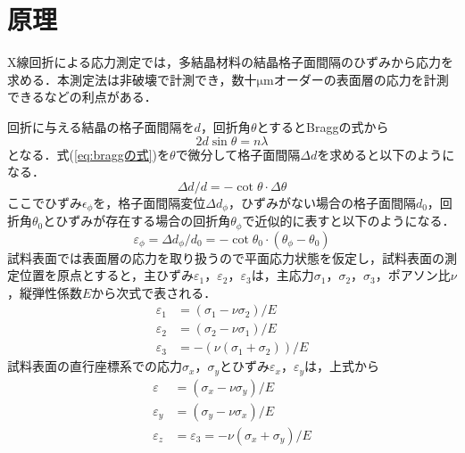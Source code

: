 \section{原理}
X線回折による応力測定では，多結晶材料の結晶格子面間隔のひずみから応力を求める．本測定法は非破壊で計測でき，数十$\mathrm{\mu m}$オーダーの表面層の応力を計測できるなどの利点がある．

回折に与える結晶の格子面間隔を$d$，回折角$\theta$とするとBraggの式から
\begin{equation}
    2d\sin\theta = n\lambda
    \label{eq:braggの式}
\end{equation}
となる．式(\ref{eq:braggの式})を$\theta$で微分して格子面間隔$\Delta d$を求めると以下のようになる．
\begin{equation}
    \Delta d/d = -\cot\theta \cdot \Delta \theta
    \label{eq:delta_d}
\end{equation}
ここでひずみ$\epsilon_\phi$を，格子面間隔変位$\Delta d_\phi$，ひずみがない場合の格子面間隔$d_0$，回折角$\theta_0$とひずみが存在する場合の回折角$\theta_\phi$で近似的に表すと以下のようになる．
\begin{equation}
    \varepsilon_\phi = \Delta d_\phi /d_0 = -\cot\theta_0 \cdot (\theta_\phi - \theta_0)
    \label{eq:epsilon_phi}
\end{equation}
試料表面では表面層の応力を取り扱うので平面応力状態を仮定し，試料表面の測定位置を原点とすると，主ひずみ$\varepsilon_1$，$\varepsilon_2$，$\varepsilon_3$は，主応力$\sigma_1$，$\sigma_2$，$\sigma_3$，ポアソン比$\nu$，縦弾性係数$E$から次式で表される．
\begin{subequations}
    \begin{align}
        \varepsilon_1 &= (\sigma_1 - \nu\sigma_2)/E \label{eq:主ひずみ1} \\
        \varepsilon_2 &= (\sigma_2 - \nu\sigma_1)/E \label{eq:主ひずみ2} \\
        \varepsilon_3 &= -(\nu(\sigma_1 + \sigma_2))/E \label{eq:主ひずみ3}
    \end{align}
\end{subequations}
試料表面の直行座標系での応力$\sigma_x$，$\sigma_y$とひずみ$\varepsilon_x$，$\varepsilon_y$は，上式から
\begin{subequations}
    \begin{align}
        \varepsilon &= (\sigma_x - \nu\sigma_y)/E \label{eq:ひずみ_x} \\
        \varepsilon_y &= (\sigma_y - \nu\sigma_x)/E \label{eq:ひずみ_y} \\
        \varepsilon_z &= \varepsilon_3 = -\nu(\sigma_x + \sigma_y)/E \label{eq:ひずみ_z}
    \end{align}
\end{subequations}
